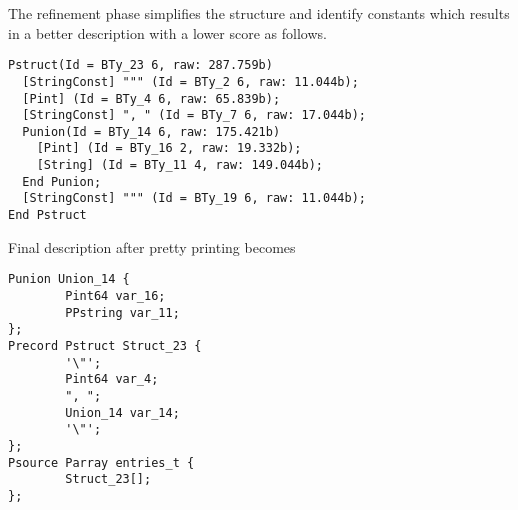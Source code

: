 \documentclass{sig-alternate-sigmod08}
\begin{document}
The refinement phase simplifies the structure
and identify constants which results in a better
description with a lower score as follows.

{\small
\begin{verbatim}
Pstruct(Id = BTy_23 6, raw: 287.759b)
  [StringConst] """ (Id = BTy_2 6, raw: 11.044b);
  [Pint] (Id = BTy_4 6, raw: 65.839b);
  [StringConst] ", " (Id = BTy_7 6, raw: 17.044b);
  Punion(Id = BTy_14 6, raw: 175.421b)
    [Pint] (Id = BTy_16 2, raw: 19.332b);
    [String] (Id = BTy_11 4, raw: 149.044b);
  End Punion;
  [StringConst] """ (Id = BTy_19 6, raw: 11.044b);
End Pstruct
\end{verbatim}
}

Final \pads{} description after pretty printing
becomes
{\small
\begin{verbatim}
Punion Union_14 {
        Pint64 var_16;
        PPstring var_11;
};
Precord Pstruct Struct_23 {
        '\"';
        Pint64 var_4;
        ", ";
        Union_14 var_14;
        '\"';
};
Psource Parray entries_t {
        Struct_23[];
};
\end{verbatim}
}

%
%
%



\end{document}
